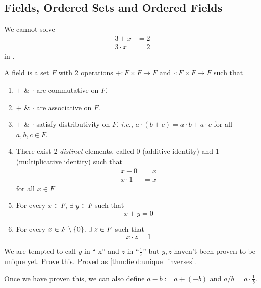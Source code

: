 \subsection{Fields, Ordered Sets and Ordered Fields}
We cannot solve
\begin{align*}
    3 + x &= 2 \\
    3 \cdot x &= 2
\end{align*}
\hfill in \N.

\begin{defn} \label{defn:field}
    A field is a set $F$ with 2 operations $+ : F \times F \to F$ and $\cdot : F \times F \to F$ such that
    \begin{enumerate}[label=(F\arabic*)]
        \item \label{defn:field:commutativity}
            $+$ \& $\cdot$ are commutative on $F$.
        \item \label{defn:field:associativity}
            $+$ \& $\cdot$ are associative on $F$.
        \item \label{defn:field:distributivity}
            $+$ \& $\cdot$ satisfy distributivity on $F$, \textit{i.e.}, $a \cdot (b + c) = a \cdot b + a \cdot c$ for all $a, b, c \in F$. 
        \item \label{defn:field:identity}
            There exist 2 \emph{distinct} elements, called 0 (additive identity) and 1 (multiplicative identity) such that
            \begin{align*}
                x + 0 &= x \\
                x \cdot 1 &= x
            \end{align*}
            for all $x \in F$
        \item \label{defn:field:negative}
            For every $x \in F, \,\exists\; y \in F$ such that \[
                x + y = 0
            \]
        \item \label{defn:field:reciprocal}
            For every $x \in F \setminus \set{0}, \,\exists\; z \in F$ such that \[
                x \cdot z = 1
            \]
    \end{enumerate}
\end{defn}
\begin{rem}
    We are tempted to call $y$ in  ``-x'' and $z$ in  ``$\frac{1}{x}$'' but $y, z$ haven't been proven to be unique yet.
    \textcolor{exercise}{Prove this}.
    \textcolor{solved}{Proved as \cref{thm:field:unique_inverses}}.

    Once we have proven this, we can also define $a - b := a + (-b)$ and $a/b = a \cdot \frac{1}{b}$.
\end{rem}

